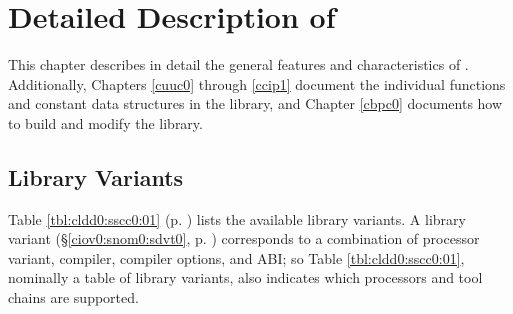 \chapter{Detailed Description of \emph{\productbasenameshort{}}}
\label{cldd0}

This chapter describes in detail the general features and characteristics
of \emph{\productbasenameshort{}}\@.  Additionally, Chapters \ref{cuuc0}
through \ref{ccip1} document the individual functions and constant data
structures in the library, and Chapter \ref{cbpc0} documents how to build
and modify the library.


\section{Library Variants}
\label{cldd0:sscc0}

Table \ref{tbl:cldd0:sscc0:01} (p.  
\pageref{tbl:cldd0:sscc0:01}) lists the available library 
variants.  A library variant (\S{}\ref{ciov0:snom0:sdvt0}, 
p.  \pageref{ciov0:snom0:sdvt0}) corresponds to a 
combination of processor variant, compiler, compiler 
options, and ABI; so Table \ref{tbl:cldd0:sscc0:01}, 
nominally a table of library variants, also indicates which 
processors and tool chains are supported.  

